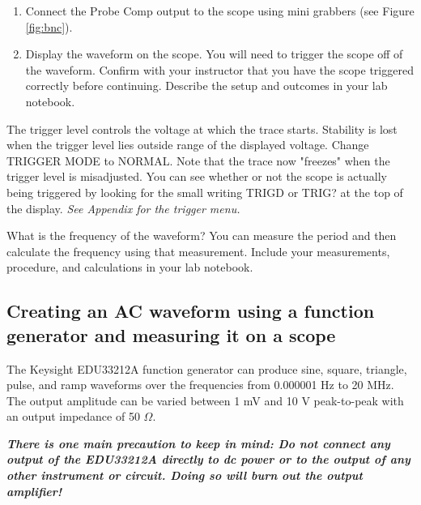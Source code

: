 \documentclass[10pt]{PhysLab1C} %
\begin{document}
\begin{enumerate}
\def\labelenumi{\arabic{enumi}.}
\item
  Connect the Probe Comp output to the scope using mini grabbers (see
  Figure \ref{fig:bnc}).
\item
  Display the waveform on the scope. You will need to trigger the scope
  off of the waveform. Confirm with your instructor that you have the
  scope triggered correctly before continuing. Describe the setup and
  outcomes in your lab notebook.
\end{enumerate}

The trigger level controls the voltage at which the trace starts.
Stability is lost when the trigger level lies outside range of the
displayed voltage. Change TRIGGER MODE to NORMAL. Note that the trace
now "freezes" when the trigger level is misadjusted. You can see whether
or not the scope is actually being triggered by looking for the small
writing TRIG\textquotesingle D or TRIG? at the top of the display.
\emph{See Appendix for the trigger menu.}

What is the frequency of the waveform? You can measure the period and
then calculate the frequency using that measurement. Include your
measurements, procedure, and calculations in your lab notebook.


\subsection{Creating an AC waveform using a function generator and measuring it on a scope}

The Keysight EDU33212A function generator can produce sine, square,
triangle, pulse, and ramp waveforms over the frequencies from 0.000001
Hz to 20 MHz. The output amplitude can be varied between 1 mV and 10 V
peak-to-peak with an output impedance of 50 $\Omega$.

\emph{\textbf{There is one main precaution to keep in mind: Do not
connect any output of the EDU33212A directly to dc power or to the
output of any other instrument or circuit. Doing so will burn out the
output amplifier!}}
\end{document}
